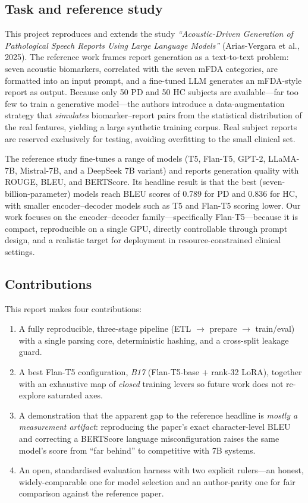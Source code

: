 \documentclass[11pt,twocolumn]{article}
\begin{document}
\subsection{Task and reference study}
This project reproduces and extends the study \emph{``Acoustic-Driven Generation of Pathological
Speech Reports Using Large Language Models''} (Arias-Vergara et al., 2025). The reference work
frames report generation as a text-to-text problem: seven acoustic biomarkers, correlated with
the seven mFDA categories, are formatted into an input prompt, and a fine-tuned LLM generates an
mFDA-style report as output. Because only 50 PD and 50 HC subjects are available---far too few to
train a generative model---the authors introduce a data-augmentation strategy that
\emph{simulates} biomarker--report pairs from the statistical distribution of the real features,
yielding a large synthetic training corpus. Real subject reports are reserved exclusively for
testing, avoiding overfitting to the small clinical set.

The reference study fine-tunes a range of models (T5, Flan-T5, GPT-2, LLaMA-7B, Mistral-7B, and
a DeepSeek 7B variant) and reports generation quality with ROUGE, BLEU, and BERTScore. Its
headline result is that the best (seven-billion-parameter) models reach BLEU scores of 0.789 for
PD and 0.836 for HC, with smaller encoder--decoder models such as T5 and Flan-T5 scoring lower.
Our work focuses on the encoder--decoder family---specifically Flan-T5---because it is compact,
reproducible on a single GPU, directly controllable through prompt design, and a realistic target
for deployment in resource-constrained clinical settings.

\subsection{Contributions}
This report makes four contributions:
\begin{enumerate}[leftmargin=1.3em,itemsep=0.15em,topsep=0.2em]
  \item A fully reproducible, three-stage pipeline (ETL $\rightarrow$ prepare $\rightarrow$
        train/eval) with a single parsing core, deterministic hashing, and a cross-split leakage
        guard.
  \item A best Flan-T5 configuration, \emph{B17} (Flan-T5-base $+$ rank-32 LoRA), together with
        an exhaustive map of \emph{closed} training levers so future work does not re-explore
        saturated axes.
  \item A demonstration that the apparent gap to the reference headline is \emph{mostly a
        measurement artifact}: reproducing the paper's exact character-level BLEU and correcting
        a BERTScore language misconfiguration raises the same model's score from ``far behind''
        to competitive with 7B systems.
  \item An open, standardised evaluation harness with two explicit rulers---an honest,
        widely-comparable one for model selection and an author-parity one for fair comparison
        against the reference paper.
\end{enumerate}
\end{document}
